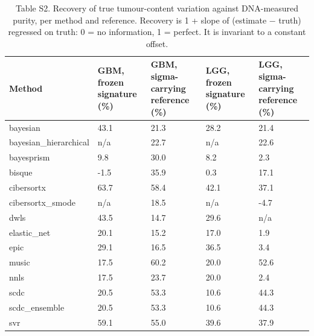 \begin{table}[htbp]
\centering
\small
\caption{Table S2. Recovery of true tumour-content variation against DNA-measured purity, per method and reference. Recovery is 1 + slope of (estimate − truth) regressed on truth: 0 = no information, 1 = perfect. It is invariant to a constant offset.}
\label{tab:S2_tumour_recovery}
\begin{tabular}{lllll}
\toprule
\textbf{Method} & \textbf{GBM, frozen signature (\%)} & \textbf{GBM, sigma-carrying reference (\%)} & \textbf{LGG, frozen signature (\%)} & \textbf{LGG, sigma-carrying reference (\%)} \\
\midrule
bayesian & 43.1 & 21.3 & 28.2 & 21.4 \\
bayesian\_hierarchical & n/a & 22.7 & n/a & 22.6 \\
bayesprism & 9.8 & 30.0 & 8.2 & 2.3 \\
bisque & -1.5 & 35.9 & 0.3 & 17.1 \\
cibersortx & 63.7 & 58.4 & 42.1 & 37.1 \\
cibersortx\_smode & n/a & 18.5 & n/a & -4.7 \\
dwls & 43.5 & 14.7 & 29.6 & n/a \\
elastic\_net & 20.1 & 15.2 & 17.0 & 1.9 \\
epic & 29.1 & 16.5 & 36.5 & 3.4 \\
music & 17.5 & 60.2 & 20.0 & 52.6 \\
nnls & 17.5 & 23.7 & 20.0 & 2.4 \\
scdc & 20.5 & 53.3 & 10.6 & 44.3 \\
scdc\_ensemble & 20.5 & 53.3 & 10.6 & 44.3 \\
svr & 59.1 & 55.0 & 39.6 & 37.9 \\
\bottomrule
\end{tabular}
\end{table}

